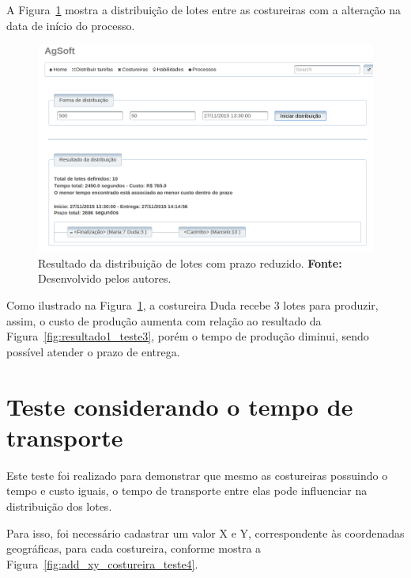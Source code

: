 A Figura~\ref{fig:resultado2_teste3} mostra a distribuição de lotes entre as
costureiras com a alteração na data de início do processo.

\begin{figure}[h!]
	\centerline{\includegraphics[width=14.7cm]{./imagens/resultado2_teste3.png}}
	\caption[Resultado da distribuição de lotes com prazo reduzido.]
	{Resultado da distribuição de lotes com prazo reduzido. \textbf{Fonte:} Desenvolvido pelos
	autores.}
	\label{fig:resultado2_teste3}
\end{figure}

\par Como ilustrado na Figura~\ref{fig:resultado2_teste3}, a costureira Duda
recebe 3 lotes para produzir, assim, o custo de produção aumenta com relação ao 
resultado da Figura~\ref{fig:resultado1_teste3}, porém o tempo de produção
diminui, sendo possível atender o prazo de entrega.


\section{Teste considerando o tempo de transporte}

\par Este teste foi realizado para demonstrar que mesmo as costureiras possuindo
o tempo e custo iguais, o tempo de transporte entre elas pode influenciar na distribuição dos lotes.

\par Para isso, foi necessário cadastrar um valor X e Y, correspondente às
coordenadas geográficas, para cada costureira, conforme mostra a Figura~\ref{fig:add_xy_costureira_teste4}.


